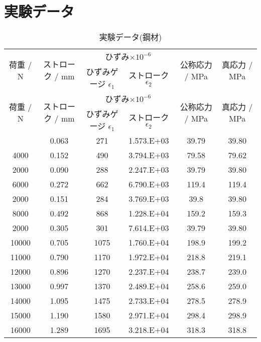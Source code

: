 \appendix
\renewcommand{\thetable}{\Alph{section}.\arabic{table}}
\setcounter{table}{0}
\section{実験データ}
\begin{longtable}{cccccc}
  \caption{実験データ(鋼材)}
  \label{tab:steel_data} \\
  \hline
     \multirow{2}{*}{荷重 / N}&\multirow{2}{*}{ストローク / mm}&\multicolumn{2}{c}{ひずみ$\times10^{-6}$}&\multirow{2}{*}{公称応力 / MPa}&\multirow{2}{*}{真応力 / MPa}\\
     &&ひずみゲージ $\epsilon_1$&ストローク $\epsilon_2$\\
     \hline \hline
  \endfirsthead
  \hline
     \multirow{2}{*}{荷重 / N}&\multirow{2}{*}{ストローク / mm}&\multicolumn{2}{c}{ひずみ$\times10^{-6}$}&\multirow{2}{*}{公称応力 / MPa}&\multirow{2}{*}{真応力 / MPa}\\
     &&ひずみゲージ $\epsilon_1$&ストローク $\epsilon_2$\\
     \hline \hline
  \endhead
  \hline
  \endfoot
  \hline
  \endlastfoot
  2000 & 0.063 & 271 & 1.573.E+03 & 39.79 & 39.80 \\
  4000 & 0.152 & 490 & 3.794.E+03 & 79.58 & 79.62 \\
  2000 & 0.090 & 288 & 2.247.E+03 & 39.79 & 39.80 \\
  6000 & 0.272 & 662 & 6.790.E+03 & 119.4 & 119.4 \\
  2000 & 0.151 & 284 & 3.769.E+03 & 39.8 & 39.80 \\
  8000 & 0.492 & 868 & 1.228.E+04 & 159.2 & 159.3 \\
  2000 & 0.305 & 301 & 7.614.E+03 & 39.79 & 39.80 \\
  10000 & 0.705 & 1075 & 1.760.E+04 & 198.9 & 199.2 \\
  11000 & 0.790 & 1170 & 1.972.E+04 & 218.8 & 219.1 \\
  12000 & 0.896 & 1270 & 2.237.E+04 & 238.7 & 239.0 \\
  13000 & 0.997 & 1370 & 2.489.E+04 & 258.6 & 259.0 \\
  14000 & 1.095 & 1475 & 2.733.E+04 & 278.5 & 278.9 \\
  15000 & 1.190 & 1580 & 2.971.E+04 & 298.4 & 298.9 \\
  16000 & 1.289 & 1695 & 3.218.E+04 & 318.3 & 318.8 \\

\end{longtable}
